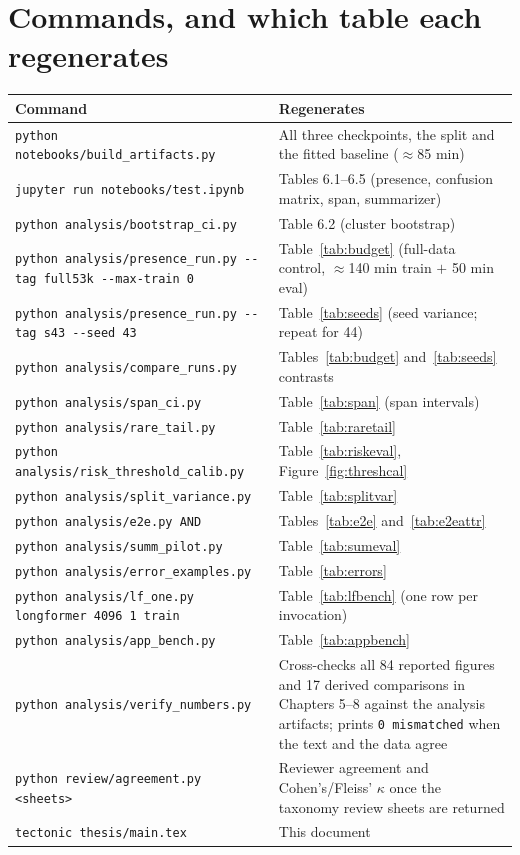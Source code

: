 \section*{Commands, and which table each regenerates}

\begin{tabular}{p{6.3cm} p{7.4cm}}
\toprule
\textbf{Command} & \textbf{Regenerates}\\
\midrule
\texttt{python notebooks/build\_artifacts.py} & All three checkpoints, the split and the fitted baseline ($\approx$85 min)\\
\texttt{jupyter run notebooks/test.ipynb} & Tables 6.1--6.5 (presence, confusion matrix, span, summarizer)\\
\texttt{python analysis/bootstrap\_ci.py} & Table 6.2 (cluster bootstrap)\\
\texttt{python analysis/presence\_run.py -{}-tag full53k -{}-max-train 0} & Table~\ref{tab:budget} (full-data control, $\approx$140 min train $+$ 50 min eval)\\
\texttt{python analysis/presence\_run.py -{}-tag s43 -{}-seed 43} & Table~\ref{tab:seeds} (seed variance; repeat for 44)\\
\texttt{python analysis/compare\_runs.py} & Tables~\ref{tab:budget} and~\ref{tab:seeds} contrasts\\
\texttt{python analysis/span\_ci.py} & Table~\ref{tab:span} (span intervals)\\
\texttt{python analysis/rare\_tail.py} & Table~\ref{tab:raretail}\\
\texttt{python analysis/risk\_threshold\_calib.py} & Table~\ref{tab:riskeval}, Figure~\ref{fig:threshcal}\\
\texttt{python analysis/split\_variance.py} & Table~\ref{tab:splitvar}\\
\texttt{python analysis/e2e.py AND} & Tables~\ref{tab:e2e} and~\ref{tab:e2eattr}\\
\texttt{python analysis/summ\_pilot.py} & Table~\ref{tab:sumeval}\\
\texttt{python analysis/error\_examples.py} & Table~\ref{tab:errors}\\
\texttt{python analysis/lf\_one.py longformer 4096 1 train} & Table~\ref{tab:lfbench} (one row per invocation)\\
\texttt{python analysis/app\_bench.py} & Table~\ref{tab:appbench}\\
\texttt{python analysis/verify\_numbers.py} & Cross-checks all 84 reported figures and 17 derived
comparisons in Chapters 5--8 against the analysis artifacts; prints \texttt{0 mismatched} when the
text and the data agree\\
\texttt{python review/agreement.py <sheets>} & Reviewer agreement and Cohen's/Fleiss' $\kappa$ once
the taxonomy review sheets are returned\\
\texttt{tectonic thesis/main.tex} & This document\\
\bottomrule
\end{tabular}

